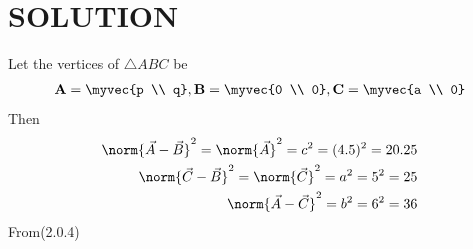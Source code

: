 \documentclass[journal,12pt,twocolumn]{IEEEtran}
\begin{document}
\section{SOLUTION}
Let the vertices of $\triangle ABC$ be
\begin{align}
\textbf{A}=\myvec{p \\ q},
\textbf{B}=\myvec{0 \\ 0} ,
\textbf{C}=\myvec{a \\ 0}
\end{align}
Then
\begin{align}
\norm{\vec{A}-\vec{B}}^2 = \norm{\vec{A}}^2  = c^2 =(4.5)^2 =20.25
\\
\norm{\vec{C}-\vec{B}}^2 = \norm{\vec{C}}^2 =a^2 =5^2 =25
\\
\norm{\vec{A}-\vec{C}}^2 = b^2= 6^2 =36
\end{align}
From(2.0.4)
\\
\end{document}
